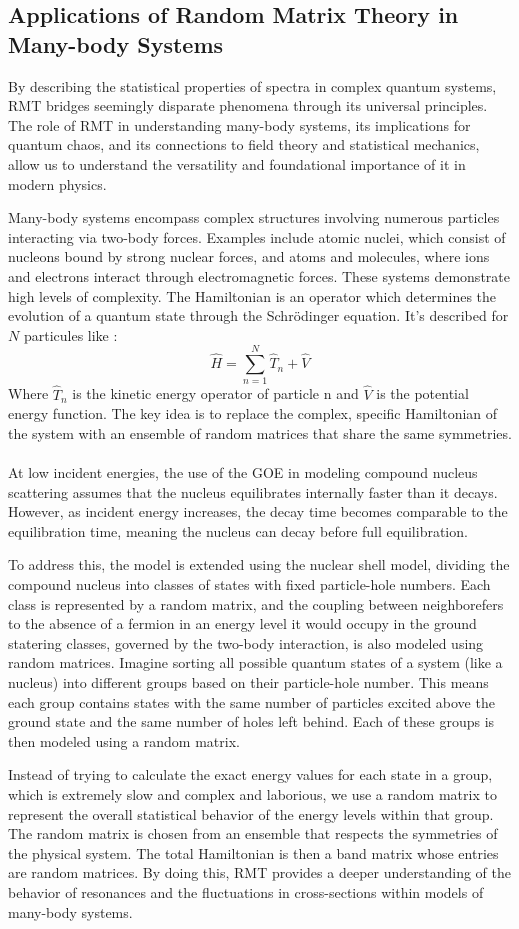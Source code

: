 \subsection{Applications of Random Matrix Theory in Many-body Systems}\label{subsec:applications-of-random-matrix-theory-in-many-body-systems}

By describing the statistical properties of spectra in complex quantum systems, RMT bridges seemingly disparate phenomena through its universal principles.
The role of RMT in understanding many-body systems, its implications for quantum chaos, and its connections to field theory and statistical mechanics, allow us to understand the versatility and foundational importance of it in modern physics.

Many-body systems encompass complex structures involving numerous particles interacting via two-body forces.
Examples include atomic nuclei, which consist of nucleons bound by strong nuclear forces, and atoms and molecules, where ions and electrons interact through electromagnetic forces.
These systems demonstrate high levels of complexity.
The Hamiltonian is an operator which determines the evolution of a quantum state through the Schrödinger equation.
It's described for $N$ particules like :
\[\hat{H}=\sum^N_{n=1}\hat{T}_n+\hat{V}\]
Where $\hat{T}_n$ is the kinetic energy operator of particle n and $\hat{V}$ is the potential energy function.
The key idea is to replace the complex, specific Hamiltonian of the system with an ensemble of random matrices that share the same symmetries.
\\\\
At low incident energies, the use of the GOE in modeling compound nucleus scattering assumes that the nucleus equilibrates internally faster than it decays.
However, as incident energy increases, the decay time becomes comparable to the equilibration time, meaning the nucleus can decay before full equilibration.

\noindent To address this, the model is extended using the nuclear shell model, dividing the compound nucleus into classes of states with fixed particle-hole numbers.
Each class is represented by a random matrix, and the coupling between neighborefers to the absence of a fermion in an energy level it would occupy in the ground statering classes, governed by the two-body interaction, is also modeled using random matrices.
Imagine sorting all possible quantum states of a system (like a nucleus) into different groups based on their particle-hole number.
This means each group contains states with the same number of particles excited above the ground state and the same number of holes left behind.
Each of these groups is then modeled using a random matrix.

Instead of trying to calculate the exact energy values for each state in a group, which is extremely slow and complex and laborious, we use a random matrix to represent the overall statistical behavior of the energy levels within that group.
The random matrix is chosen from an ensemble that respects the symmetries of the physical system.
The total Hamiltonian is then a band matrix whose entries are random matrices.
By doing this, RMT provides a deeper understanding of the behavior of resonances and the fluctuations in cross-sections within models of many-body systems.